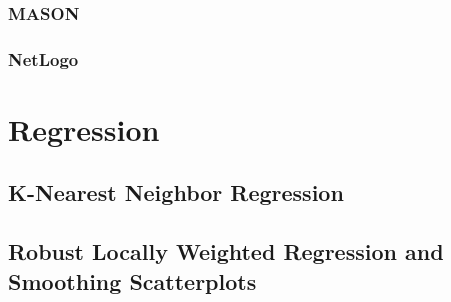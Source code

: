 \subsubsection{MASON}
   \cite{Luke}
\subsubsection{NetLogo}
   \cite{tisue2004netlogo}


\section{Regression}
\subsection{K-Nearest Neighbor Regression}
      
\subsection{Robust Locally Weighted Regression and Smoothing Scatterplots}
   \cite{cleveland1979robust}\cite{cleveland1988locally}


